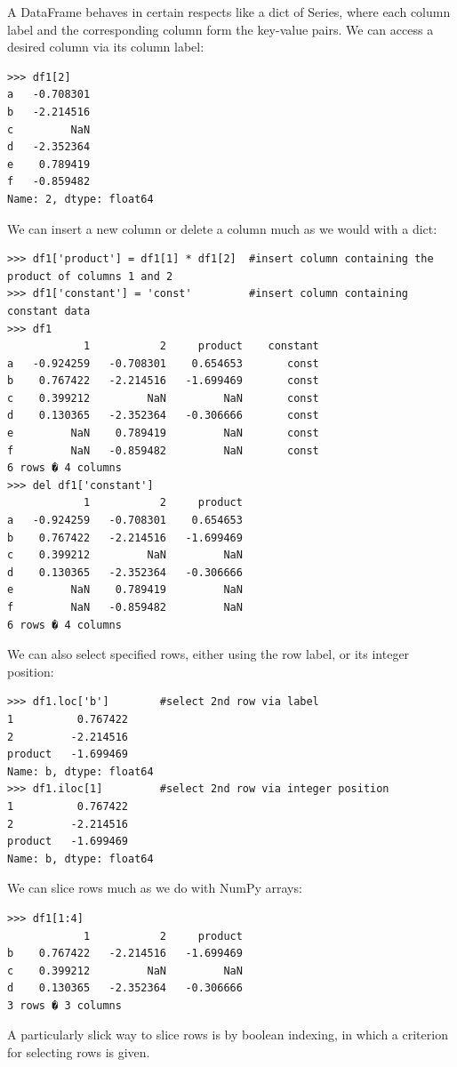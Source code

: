 A DataFrame behaves in certain respects like a dict of Series, where each column label and the corresponding column form the key-value pairs.
We can access a desired column via its column label:
\begin{lstlisting}
>>> df1[2]
a   -0.708301
b   -2.214516
c         NaN
d   -2.352364
e    0.789419
f   -0.859482
Name: 2, dtype: float64
\end{lstlisting}
We can insert a new column or delete a column much as we would with a dict:
\begin{lstlisting}
>>> df1['product'] = df1[1] * df1[2]  #insert column containing the product of columns 1 and 2
>>> df1['constant'] = 'const'         #insert column containing constant data
>>> df1
            1	        2	  product	 constant
a	-0.924259	-0.708301	 0.654653	    const
b	 0.767422	-2.214516	-1.699469	    const
c	 0.399212	      NaN	      NaN	    const
d	 0.130365	-2.352364	-0.306666	    const
e	      NaN	 0.789419	      NaN	    const
f	      NaN	-0.859482	      NaN	    const
6 rows � 4 columns
>>> del df1['constant']
            1	        2	  product	
a	-0.924259	-0.708301	 0.654653	
b	 0.767422	-2.214516	-1.699469	
c	 0.399212	      NaN	      NaN	
d	 0.130365	-2.352364	-0.306666	
e	      NaN	 0.789419	      NaN	
f	      NaN	-0.859482	      NaN	
6 rows � 4 columns
\end{lstlisting}

We can also select specified rows, either using the row label, or its integer position:
\begin{lstlisting}
>>> df1.loc['b']        #select 2nd row via label
1          0.767422
2         -2.214516
product   -1.699469
Name: b, dtype: float64
>>> df1.iloc[1]         #select 2nd row via integer position
1          0.767422
2         -2.214516
product   -1.699469
Name: b, dtype: float64
\end{lstlisting}
We can slice rows much as we do with NumPy arrays:
\begin{lstlisting}
>>> df1[1:4]
	        1	        2	  product
b	 0.767422	-2.214516	-1.699469
c	 0.399212	      NaN	      NaN
d	 0.130365	-2.352364	-0.306666
3 rows � 3 columns
\end{lstlisting}

A particularly slick way to slice rows is by boolean indexing, in which a criterion for selecting rows is given.

